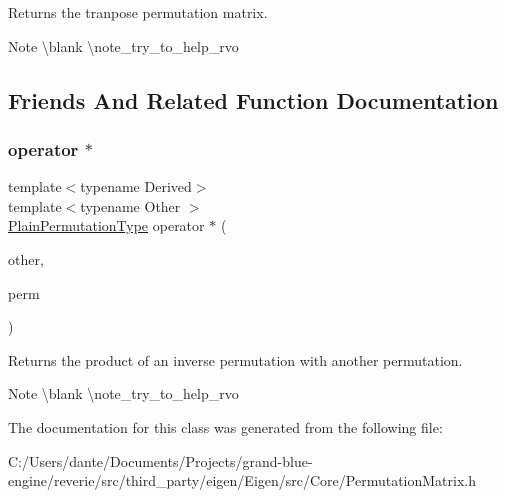 \begin{DoxyReturn}{Returns}
the tranpose permutation matrix.
\end{DoxyReturn}
\begin{DoxyNote}{Note}
\textbackslash{}blank \textbackslash{}note\+\_\+try\+\_\+to\+\_\+help\+\_\+rvo 
\end{DoxyNote}


\subsection{Friends And Related Function Documentation}
\mbox{\label{class_eigen_1_1_permutation_base_a0fb5d478cbe66c99d1b9bb6d88093aed}} 
\subsubsection{\texorpdfstring{operator $\ast$}{operator *}}
{\footnotesize\ttfamily template$<$typename Derived$>$ \\
template$<$typename Other $>$ \\
\mbox{\hyperlink{class_eigen_1_1_permutation_matrix}{Plain\+Permutation\+Type}} operator $\ast$ (\begin{DoxyParamCaption}\item[{const \mbox{\hyperlink{class_eigen_1_1_inverse_impl}{Inverse\+Impl}}$<$ Other, \mbox{\hyperlink{struct_eigen_1_1_permutation_storage}{Permutation\+Storage}} $>$ \&}]{other,  }\item[{const \mbox{\hyperlink{class_eigen_1_1_permutation_base}{Permutation\+Base}}$<$ Derived $>$ \&}]{perm }\end{DoxyParamCaption})\hspace{0.3cm}{\ttfamily [friend]}}

\begin{DoxyReturn}{Returns}
the product of an inverse permutation with another permutation.
\end{DoxyReturn}
\begin{DoxyNote}{Note}
\textbackslash{}blank \textbackslash{}note\+\_\+try\+\_\+to\+\_\+help\+\_\+rvo 
\end{DoxyNote}


The documentation for this class was generated from the following file\+:\begin{DoxyCompactItemize}
\item 
C\+:/\+Users/dante/\+Documents/\+Projects/grand-\/blue-\/engine/reverie/src/third\+\_\+party/eigen/\+Eigen/src/\+Core/Permutation\+Matrix.\+h\end{DoxyCompactItemize}
